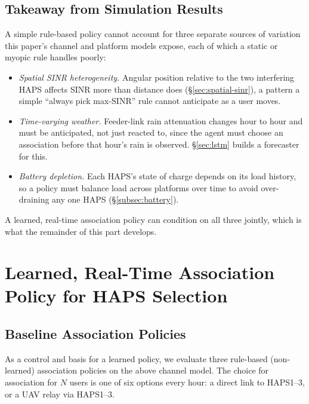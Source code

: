 \documentclass[]{ieeeaccess}
\begin{document}
\subsection{Takeaway from Simulation Results}
\label{sec:motivation-learning}

A simple rule-based policy cannot account for three separate sources of variation this paper's channel and platform models expose, each of which a static or myopic rule handles poorly:
\begin{itemize}
  \item \emph{Spatial SINR heterogeneity.} Angular position relative to the two interfering HAPS affects SINR more than distance does (\S\ref{sec:spatial-sinr}), a pattern a simple ``always pick max-SINR'' rule cannot anticipate as a user moves.
  \item \emph{Time-varying weather.} Feeder-link rain attenuation changes hour to hour and must be anticipated, not just reacted to, since the agent must choose an association before that hour's rain is observed. \S\ref{sec:lstm} builds a forecaster for this.
  \item \emph{Battery depletion.} Each HAPS's state of charge depends on its load history, so a policy must balance load across platforms over time to avoid over-draining any one HAPS (\S\ref{subsec:battery}).
\end{itemize}
A learned, real-time association policy can condition on all three jointly, which is what the remainder of this part develops.

\section{Learned, Real-Time Association Policy for HAPS Selection}

\subsection{Baseline Association Policies}
\label{sec:baseline-policies}

As a control and basis for a learned policy, we evaluate three rule-based (non-learned) association policies on the above channel model. The choice for association for $N$ users is one of six options every hour: a direct link to HAPS1--3, or a UAV relay via HAPS1--3.
\end{document}
